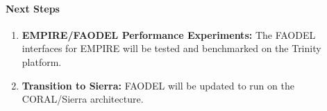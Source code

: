\paragraph{Next Steps}
\begin{enumerate}
  \item \textbf{EMPIRE/FAODEL Performance Experiments:} The FAODEL interfaces for EMPIRE will be tested and benchmarked on the Trinity platform. 
  \item \textbf{Transition to Sierra:} FAODEL will be updated to run on the CORAL/Sierra architecture.
\end{enumerate}
